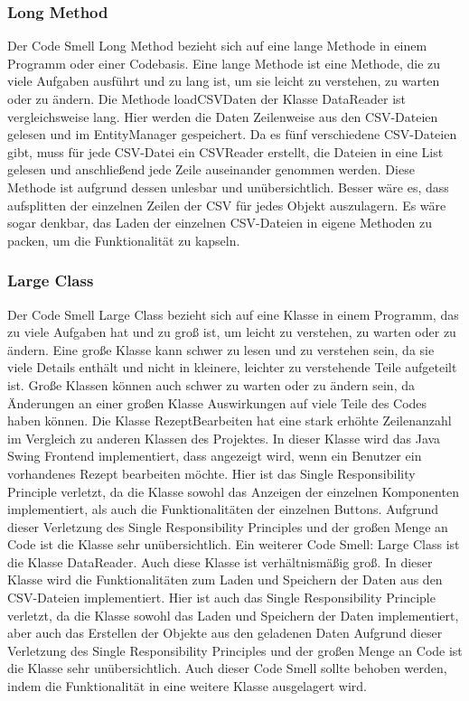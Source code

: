 \subsubsection{Long Method}\label{LM}
Der Code Smell Long Method bezieht sich auf eine lange Methode in einem Programm oder einer Codebasis. Eine lange Methode ist eine Methode, die zu viele Aufgaben ausführt und zu lang ist, um sie leicht zu verstehen, zu warten oder zu ändern. 
Die Methode loadCSVDaten der Klasse DataReader ist vergleichsweise lang. Hier werden die Daten Zeilenweise aus den CSV-Dateien gelesen und im EntityManager gespeichert.
Da es fünf verschiedene CSV-Dateien gibt, muss für jede CSV-Datei ein CSVReader erstellt, die Dateien in eine List gelesen und anschließend jede Zeile auseinander genommen werden. Diese Methode ist aufgrund dessen unlesbar und unübersichtlich. Besser wäre es, dass aufsplitten der einzelnen Zeilen der CSV für jedes Objekt auszulagern. Es wäre sogar denkbar, das Laden der einzelnen CSV-Dateien in eigene Methoden zu packen, um die Funktionalität zu kapseln.
\subsubsection{Large Class}
Der Code Smell Large Class bezieht sich auf eine Klasse in einem Programm, das zu viele Aufgaben hat und zu groß ist, um leicht zu verstehen, zu warten oder zu ändern. Eine große Klasse kann schwer zu lesen und zu verstehen sein, da sie viele Details enthält und nicht in kleinere, leichter zu verstehende Teile aufgeteilt ist. Große Klassen können auch schwer zu warten oder zu ändern sein, da Änderungen an einer großen Klasse Auswirkungen auf viele Teile des Codes haben können. Die Klasse RezeptBearbeiten hat eine stark erhöhte Zeilenanzahl im Vergleich zu anderen Klassen des Projektes. In dieser Klasse wird das Java Swing Frontend implementiert, dass angezeigt wird, wenn ein Benutzer ein vorhandenes Rezept bearbeiten möchte. Hier ist das
Single Responsibility Principle verletzt, da die Klasse sowohl das Anzeigen der einzelnen Komponenten implementiert, als auch die Funktionalitäten der einzelnen Buttons. Aufgrund dieser Verletzung des Single Responsibility Principles und der großen Menge an Code ist die Klasse sehr unübersichtlich. Ein weiterer Code Smell: Large Class ist die Klasse DataReader. Auch diese Klasse ist verhältnismäßig groß. In dieser Klasse wird die Funktionalitäten zum Laden und Speichern der Daten aus den CSV-Dateien implementiert. Hier ist auch das Single Responsibility Principle verletzt, da die Klasse sowohl das Laden und Speichern der Daten implementiert, aber auch das Erstellen der Objekte aus den geladenen Daten Aufgrund dieser Verletzung des Single Responsibility Principles und der großen Menge an Code ist die Klasse sehr unübersichtlich. Auch dieser Code Smell sollte behoben werden, indem die Funktionalität in eine weitere Klasse ausgelagert wird.
